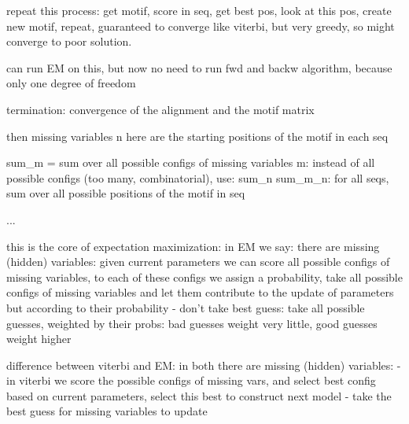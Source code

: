 repeat this process: get motif, score in seq, get best pos, look at this pos, create new motif, repeat, guaranteed to converge like viterbi, but very greedy, so might converge to poor solution.

can run EM on this, but now no need to run fwd and backw algorithm, because only one degree of freedom

termination: convergence of the alignment and the motif matrix

then missing variables n here are the starting positions of the motif in each seq

sum_m = 
sum over all possible configs of missing variables m:
instead of all possible configs (too many, combinatorial), use:
sum_n sum_m_n: for all seqs, sum over all possible positions of the motif in seq

...

this is the core of expectation maximization:
in EM we say:
there are missing (hidden) variables:
given current parameters we can score all possible configs of missing variables, to each of these configs we assign a probability, 
take all possible configs of missing variables and let them contribute to the update of parameters but according to their probability
- don't take best guess: take all possible guesses, weighted by their probs: bad guesses weight very little, good guesses weight higher

difference between viterbi and EM:
in both there are missing (hidden) variables:
- in viterbi we score the possible configs of missing vars, and select best config based on current parameters, select this best to construct next model
- take the best guess for missing variables to update


